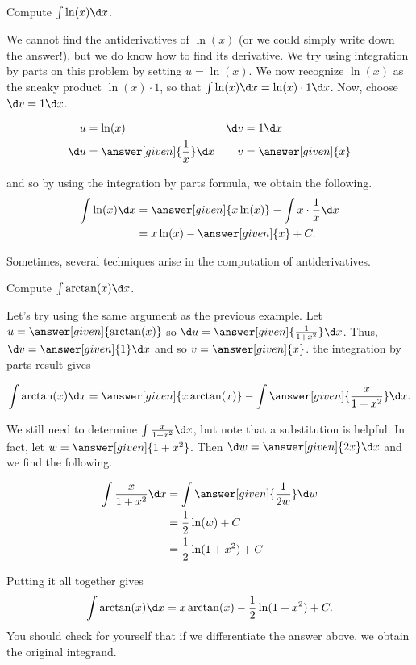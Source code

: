 \documentclass{ximera}
\begin{document}
\begin{example}
Compute $\int \ln(x)\d x$.

\begin{explanation}
We cannot find the antiderivatives of $\ln(x)$ (or we could simply write down the answer!), but we do know how to find its derivative.  We try using integration by parts on this problem by setting $u=\ln(x)$.  We now recognize $\ln(x)$ as the sneaky product $\ln(x) \cdot 1$, so that $\int \ln(x) \d x = \ln(x) \cdot 1 \d x$.  Now, choose $\d v = 1 \d x$.  

\begin{align*}
u &= \ln(x) & \d v & =1 \d x \\
 \d u &= \answer[given]{\frac{1}{x}} \d x & v&= \answer[given]{x}
\end{align*}

and so by using the integration by parts formula, we obtain the following.
\begin{align*}
 \int \ln(x)\d x&=\answer[given]{x \ln(x)}-\int x \cdot \frac{1}{x}\d x\\
&= x\ln (x)- \answer[given]{x}+C.\\
\end{align*}
\end{explanation}
\end{example}

Sometimes, several techniques arise in the computation of antiderivatives.

\begin{example}
Compute $\int \arctan(x) \d x$.

\begin{explanation}
Let's try using the same argument as the previous example.  Let $u=\answer[given]{\arctan (x)}$ so $\d u=\answer[given]{\frac{1}{1+x^{2}} } \d x$. Thus, $\d v=\answer[given]{1} \d x$ and so $v=\answer[given]{x}$.  the integration by parts result gives 


\[
\int \arctan(x) \d x= \answer[given]{x\arctan(x)}- \int \answer[given]{\frac{x}{1+x^2}} \d x.
\]

We still need to determine $\int \frac{x}{1+x^{2}} \d x$, but note that a substitution is helpful.  In fact, let $w=\answer[given]{1+x^2}$. Then $\d w=\answer[given]{2 x} \d x$ and we find the following.

\begin{align*}
\int \frac{x}{1+x^{2}} \d x &= \int \answer[given]{\frac{1}{2 w}} \d w \\
&= \frac{1}{2} \ln(w) + C\\
&=\frac{1}{2} \ln(1+x^{2})+C 
\end{align*}

Putting it all together gives
\[ 
\int \arctan(x) \d x = x \arctan(x) -\frac{1}{2} \ln(1+x^{2}) +C.
\]
You should check for yourself that if we differentiate the answer above, we obtain the original integrand.

\end{explanation}

\end{example}
\end{document}
